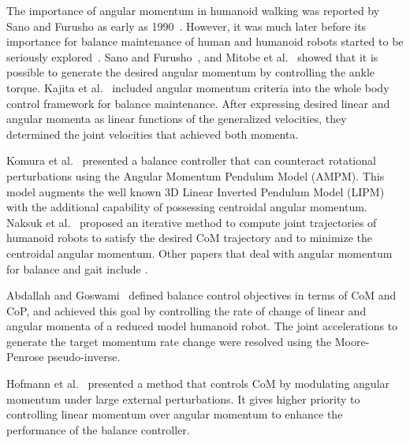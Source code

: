 \documentclass{llncs}
\begin{document}
The importance of angular momentum in humanoid walking was reported by Sano and
Furusho as early as 1990~\cite{Sano90}. However, it was much later before its
importance for balance maintenance
of human and humanoid robots started to be seriously explored~\cite{KKKFHYH03,Goswami04,PHH04}.
Sano and Furusho~\cite{Sano90}, and Mitobe et al.~\cite{Mitobe04}
showed that it is possible to generate the desired angular momentum
by controlling the ankle torque.
Kajita et al.~\cite{KKKFHYH03} included angular momentum criteria into the
whole body control framework for balance maintenance.
After expressing desired linear and angular momenta as linear functions of the
generalized velocities, they determined the joint velocities
that achieved both momenta.

Komura et al.~\cite{KLKK05} presented a balance controller that can counteract
rotational perturbations using the Angular Momentum Pendulum Model (AMPM).
This model augments the well known 3D Linear
Inverted Pendulum Model (LIPM)~\cite{KKKYH01} with the additional capability of possessing
centroidal angular momentum.
Naksuk et al.~\cite{Naksuk04} proposed an iterative method
to compute joint trajectories of humanoid robots to satisfy the desired CoM trajectory
and to minimize the centroidal angular momentum.
Other papers that deal with angular momentum for balance
and gait include \cite{Sian03,Ahn06,Ugurlu10,Ye10,Lasa10}.

Abdallah and Goswami~\cite{AG05} defined balance control objectives
in terms of CoM and CoP, and achieved this goal by controlling
the rate of change of linear and angular momenta of a reduced model
humanoid robot. The joint accelerations to generate the target
momentum rate change were resolved using the Moore-Penrose pseudo-inverse.

Hofmann et al.~\cite{Hofmann09} presented a method that
controls CoM by modulating angular momentum under large
external perturbations. It gives higher priority to controlling
linear momentum over angular momentum to enhance the performance
of the balance controller.

\end{document}
